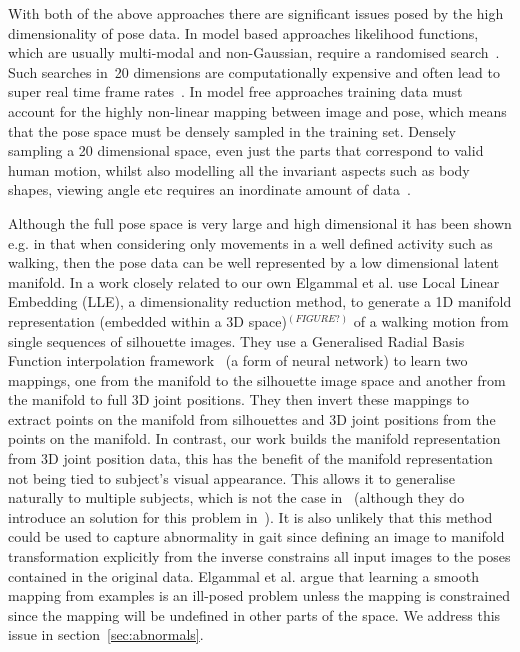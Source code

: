 \documentclass[11pt]{article} %
\begin{document}
With both of the above approaches there are significant issues posed by the high dimensionality of pose data. In model based approaches likelihood functions, which are usually multi-modal and non-Gaussian, require a randomised search~\cite{Sminchisescu2003}. Such searches in~20 dimensions are computationally expensive and often lead to super real time frame rates~\cite{Hen2009}. In model free approaches training data must account for the highly non-linear mapping between image and pose, which means that the pose space must be densely sampled in the training set. Densely sampling a 20 dimensional space, even just the parts that correspond to valid human motion, whilst also modelling all the invariant aspects such as body shapes, viewing angle etc requires an inordinate amount of data~\cite{Hen2009,Agarwal2006}.%

Although the full pose space is very large and high dimensional it has been shown e.g. in \cite{Brand1999,Elgammal2004} that when considering only movements in a well defined activity such as walking, then the pose data can be well represented by a low dimensional latent manifold. In a work closely related to our own Elgammal et al. \cite{Elgammal2004} use Local Linear Embedding (LLE), a dimensionality reduction method, to generate a 1D manifold representation (embedded within a 3D space)$^{(FIGURE?)}$ of a walking motion from single sequences of silhouette images. They use a Generalised Radial Basis Function interpolation framework~\cite{Poggio1990} (a form of neural network) to learn two mappings, one from the manifold to the silhouette image space and another from the manifold to full 3D joint positions. They then invert these mappings to extract points on the manifold from silhouettes and 3D joint positions from the points on the manifold. In contrast, our work builds the manifold representation from 3D joint position data, this has the benefit of the manifold representation not being tied to subject's visual appearance. This allows it to generalise naturally to multiple subjects, which is not the case in~\cite{Elgammal2004} (although they do introduce an solution for this problem in~\cite{Elgammal2004b}). It is also unlikely that this method could be used to capture abnormality in gait since defining an image to manifold transformation explicitly from the inverse constrains all input images to the poses contained in the original data. Elgammal et al. argue that learning a smooth mapping from examples is an ill-posed problem unless the mapping is constrained since the mapping will be undefined in other parts of the space. We address this issue in section~\ref{sec:abnormals}.
\end{document}
